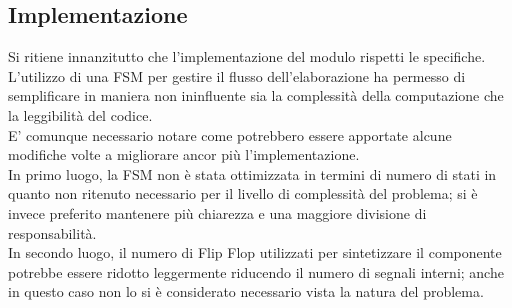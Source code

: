 \documentclass{article}
\begin{document}
\subsection{Implementazione}
Si ritiene innanzitutto che l'implementazione del modulo rispetti le specifiche.
\medskip \\ L'utilizzo di una FSM per gestire il flusso dell'elaborazione ha permesso di semplificare in maniera non ininfluente sia la complessità della computazione che la leggibilità del codice. 
\medskip \\ E' comunque necessario notare come potrebbero essere apportate alcune modifiche volte a migliorare ancor più l'implementazione.
\medskip \\ In primo luogo, la FSM non è stata ottimizzata in termini di numero di stati in quanto non ritenuto necessario per il livello di complessità del problema; si è invece preferito mantenere più chia\-rezza e una maggiore divisione di responsabilità.
\medskip \\ In secondo luogo, il numero di Flip Flop utilizzati per sintetizzare il componente potrebbe essere ridotto leggermente riducendo il numero di segnali interni; anche in questo caso non lo si è considerato necessario vista la natura del problema.
\end{document}
